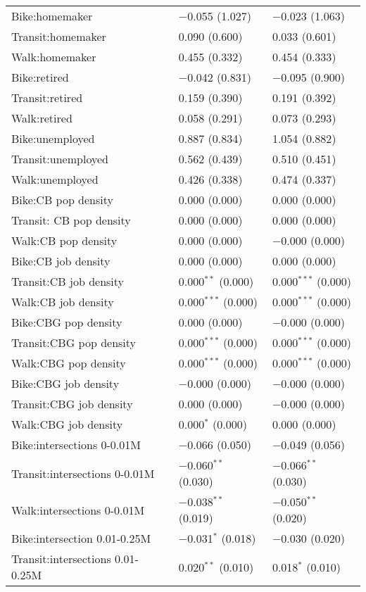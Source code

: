 \begin{longtabu}{lll}
 Bike:homemaker & $-$0.055 (1.027) & $-$0.023 (1.063) \\ 
 Transit:homemaker & 0.090 (0.600) & 0.033 (0.601) \\ 
 Walk:homemaker & 0.455 (0.332) & 0.454 (0.333) \\ 
 Bike:retired & $-$0.042 (0.831) & $-$0.095 (0.900) \\ 
 Transit:retired & 0.159 (0.390) & 0.191 (0.392) \\ 
 Walk:retired & 0.058 (0.291) & 0.073 (0.293) \\ 
 Bike:unemployed & 0.887 (0.834) & 1.054 (0.882) \\ 
 Transit:unemployed & 0.562 (0.439) & 0.510 (0.451) \\ 
 Walk:unemployed & 0.426 (0.338) & 0.474 (0.337) \\ 
 Bike:CB pop density & 0.000 (0.000) & 0.000 (0.000) \\ 
 Transit: CB pop density & 0.000 (0.000) & 0.000 (0.000) \\ 
 Walk:CB pop density & 0.000 (0.000) & $-$0.000 (0.000) \\ 
 Bike:CB job density & 0.000 (0.000) & 0.000 (0.000) \\ 
 Transit:CB job density & 0.000$^{**}$ (0.000) & 0.000$^{***}$ (0.000) \\ 
 Walk:CB job density & 0.000$^{***}$ (0.000) & 0.000$^{***}$ (0.000) \\ 
 Bike:CBG pop density & 0.000 (0.000) & $-$0.000 (0.000) \\ 
 Transit:CBG pop density & 0.000$^{***}$ (0.000) & 0.000$^{***}$ (0.000) \\ 
 Walk:CBG pop density & 0.000$^{***}$ (0.000) & 0.000$^{***}$ (0.000) \\ 
 Bike:CBG job density & $-$0.000 (0.000) & $-$0.000 (0.000) \\ 
 Transit:CBG job density & 0.000 (0.000) & $-$0.000 (0.000) \\ 
 Walk:CBG job density & 0.000$^{*}$ (0.000) & 0.000 (0.000) \\ 
 Bike:intersections 0-0.01M & $-$0.066 (0.050) & $-$0.049 (0.056) \\ 
 Transit:intersections 0-0.01M & $-$0.060$^{**}$ (0.030) & $-$0.066$^{**}$ (0.030) \\ 
 Walk:intersections 0-0.01M & $-$0.038$^{**}$ (0.019) & $-$0.050$^{**}$ (0.020) \\ 
 Bike:intersection 0.01-0.25M & $-$0.031$^{*}$ (0.018) & $-$0.030 (0.020) \\ 
 Transit:intersections 0.01-0.25M & 0.020$^{**}$ (0.010) & 0.018$^{*}$ (0.010) \\ 

\end{longtabu}
